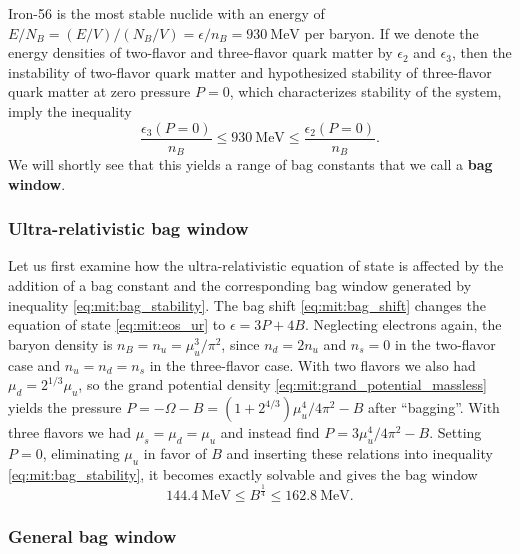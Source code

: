 Iron-56 is the most stable nuclide with an energy of $E/N_B = (E/V) / (N_B/V) = \epsilon/n_B = \SI{930}{\mega\electronvolt}$ per baryon.
If we denote the energy densities of two-flavor and three-flavor quark matter by $\epsilon_2$ and $\epsilon_3$,
then the instability of two-flavor quark matter and hypothesized stability of three-flavor quark matter at zero pressure $P=0$,
which characterizes stability of the system,
imply the inequality
\begin{equation}
	\frac{\epsilon_3(P=0)}{n_B} \leq \SI{930}{\mega\electronvolt} \leq \frac{\epsilon_2(P=0)}{n_B} .
\label{eq:mit:bag_stability}
\end{equation}
We will shortly see that this yields a range of bag constants that we call a \textbf{bag window}.

\subsubsection{Ultra-relativistic bag window}

Let us first examine how the ultra-relativistic equation of state is affected by the addition of a bag constant
and the corresponding bag window generated by inequality \eqref{eq:mit:bag_stability}.
The bag shift \eqref{eq:mit:bag_shift} changes the equation of state \eqref{eq:mit:eos_ur} to $\epsilon = 3 P + 4 B$.
Neglecting electrons again, the baryon density is $n_B = n_u = \mu_u^3 / \pi^2$,
since $n_d = 2 n_u$ and $n_s=0$ in the two-flavor case and $n_u=n_d=n_s$ in the three-flavor case.
With two flavors we also had $\mu_d = 2^{1/3} \mu_u$,
so the grand potential density \eqref{eq:mit:grand_potential_massless}
yields the pressure $P = -\Omega - B = (1 + 2^{4/3}) \mu_u^4 / 4 \pi^2 - B$ after ``bagging''.
With three flavors we had $\mu_s = \mu_d = \mu_u$ and instead find $P = 3 \mu_u^4 / 4 \pi^2 - B$.
Setting $P=0$, eliminating $\mu_u$ in favor of $B$ and inserting these relations into inequality \eqref{eq:mit:bag_stability},
it becomes exactly solvable and gives the bag window
\begin{equation}
	\SI{144.4}{\mega\electronvolt} \leq B^\frac14 \leq \SI{162.8}{\mega\electronvolt}.
\label{eq:mit:bag_window_ur}
\end{equation}

\subsubsection{General bag window}

